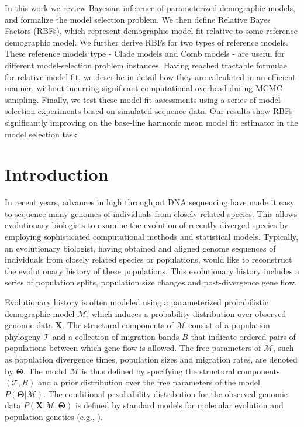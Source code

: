 \documentclass[11pt]{article}
\newcommand{\vect}[1]{\boldsymbol{\mathbf{#1}}}
\newcommand{\X}{\vect{X}}
\newcommand{\M}{\mathcal{M}}
\newcommand{\Tr}{\mathcal{T}}
\newcommand{\T}{\vect{\Theta}}
\newcommand{\1}{\mathbbm{1}}
\begin{document}
In this work we review Bayesian inference of parameterized demographic models, and formalize the model selection problem.
%
We then define Relative Bayes Factors (RBFs), which represent demographic model fit relative to some reference demographic model.
%
We further derive RBFs for two types of reference models. These reference models type - Clade models and Comb models - are useful for different model-selection problem instances.
%
Having reached tractable formulae for relative model fit, we describe in detail how they are calculated in an efficient manner, without incurring significant computational overhead during MCMC sampling. 
%
Finally, we test these model-fit assessments using a series of model-selection experiments based on simulated sequence data.
%
Our results show RBFs significantly improving on the base-line harmonic mean model fit estimator in the model selection task.


\newpage

\tableofcontents

\newpage








\section{Introduction}

In recent years, advances in high throughput DNA sequencing have made it easy to sequence many genomes of individuals from closely related species. This allows evolutionary biologists to examine the evolution of recently diverged species by employing sophisticated computational methods and statistical models.
%
Typically, an evolutionary biologist, having obtained and aligned genome sequences of individuals from closely related species or populations, would like to reconstruct the evolutionary history of these populations. This evolutionary history includes a series of population splits, population size changes and post-divergence gene flow.


Evolutionary history is often modeled using a parameterized probabilistic demographic model $\M$, which induces a probability distribution over observed genomic data $\X$.
%
The structural components of $\M$ consist of a population phylogeny $\Tr$ and a collection
of migration bands $B$ that indicate ordered pairs of populations between which gene flow is allowed.
%
The free parameters of $\M$, such as population divergence times, population sizes and migration rates, are denoted by $\T$.
%
The model $\M$ is thus defined by specifying the structural components $(\Tr,B)$ and a prior distribution over the free parameters of the model $P(\T|\M)$.
%
The conditional prxobability distribution for the observed genomic data $P(\X|\M,\T)$ is defined by standard models for molecular evolution and population genetics (e.g., \cite{JUKECANT69,KING82A}).
\end{document}
